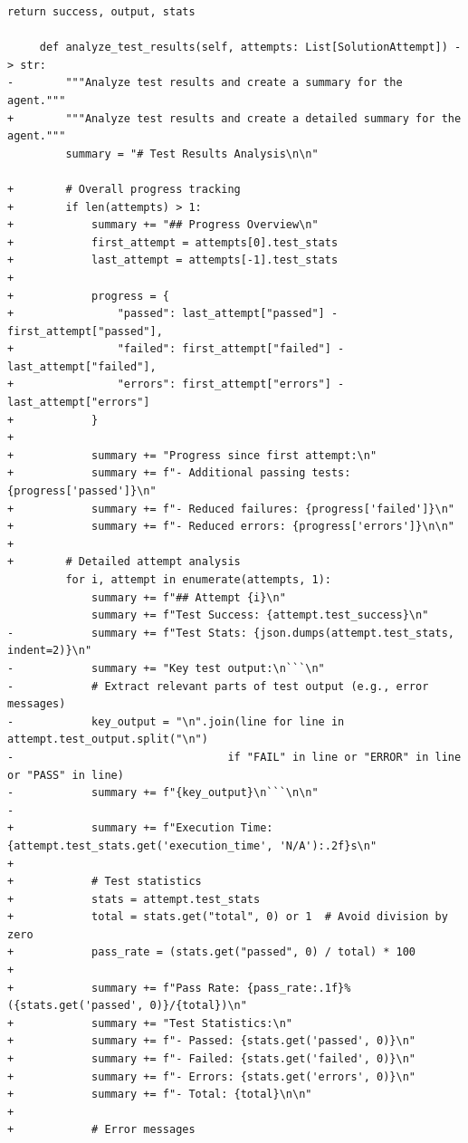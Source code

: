 \documentclass{article} %
\begin{document}
\begin{lstlisting}[style=diffstyle]
         return success, output, stats
 
     def analyze_test_results(self, attempts: List[SolutionAttempt]) -> str:
-        """Analyze test results and create a summary for the agent."""
+        """Analyze test results and create a detailed summary for the agent."""
         summary = "# Test Results Analysis\n\n"
         
+        # Overall progress tracking
+        if len(attempts) > 1:
+            summary += "## Progress Overview\n"
+            first_attempt = attempts[0].test_stats
+            last_attempt = attempts[-1].test_stats
+            
+            progress = {
+                "passed": last_attempt["passed"] - first_attempt["passed"],
+                "failed": first_attempt["failed"] - last_attempt["failed"],
+                "errors": first_attempt["errors"] - last_attempt["errors"]
+            }
+            
+            summary += "Progress since first attempt:\n"
+            summary += f"- Additional passing tests: {progress['passed']}\n"
+            summary += f"- Reduced failures: {progress['failed']}\n"
+            summary += f"- Reduced errors: {progress['errors']}\n\n"
+        
+        # Detailed attempt analysis
         for i, attempt in enumerate(attempts, 1):
             summary += f"## Attempt {i}\n"
             summary += f"Test Success: {attempt.test_success}\n"
-            summary += f"Test Stats: {json.dumps(attempt.test_stats, indent=2)}\n"
-            summary += "Key test output:\n```\n"
-            # Extract relevant parts of test output (e.g., error messages)
-            key_output = "\n".join(line for line in attempt.test_output.split("\n") 
-                                 if "FAIL" in line or "ERROR" in line or "PASS" in line)
-            summary += f"{key_output}\n```\n\n"
-
+            summary += f"Execution Time: {attempt.test_stats.get('execution_time', 'N/A'):.2f}s\n"
+            
+            # Test statistics
+            stats = attempt.test_stats
+            total = stats.get("total", 0) or 1  # Avoid division by zero
+            pass_rate = (stats.get("passed", 0) / total) * 100
+            
+            summary += f"Pass Rate: {pass_rate:.1f}% ({stats.get('passed', 0)}/{total})\n"
+            summary += "Test Statistics:\n"
+            summary += f"- Passed: {stats.get('passed', 0)}\n"
+            summary += f"- Failed: {stats.get('failed', 0)}\n"
+            summary += f"- Errors: {stats.get('errors', 0)}\n"
+            summary += f"- Total: {total}\n\n"
+            
+            # Error messages

\end{lstlisting}
\end{document}
